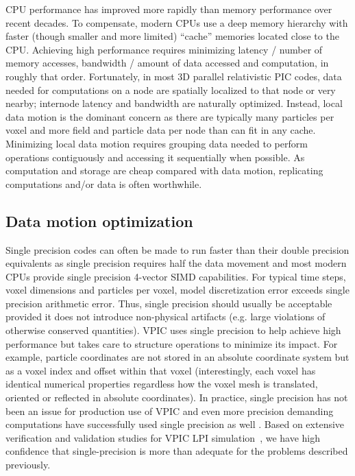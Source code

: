 \documentclass[letter,10pt]{article}
\begin{document}
CPU performance has improved more rapidly than memory performance over
recent decades.  To compensate, modern CPUs use a deep memory
hierarchy with faster (though smaller and more limited) ``cache''
memories located close to the CPU.  Achieving high performance
requires minimizing latency / number of memory accesses, bandwidth /
amount of data accessed and computation, in roughly that order.
Fortunately, in most 3D parallel relativistic PIC codes, data needed
for computations on a node are spatially localized to that node or
very nearby; internode latency and bandwidth are naturally optimized.
Instead, local data motion is the dominant concern as there are
typically many particles per voxel and more field and particle data
per node than can fit in any cache.  Minimizing local data motion
requires grouping data needed to perform operations contiguously and
accessing it sequentially when possible.  As computation and storage
are cheap compared with data motion, replicating computations and/or
data is often worthwhile.

\subsection{Data motion optimization}

Single precision codes can often be made to run faster than their
double precision equivalents as single precision requires half the
data movement and most modern CPUs provide single precision 4-vector
SIMD capabilities.  For typical time steps, voxel dimensions and
particles per voxel, model discretization error exceeds single
precision arithmetic error.  Thus, single precision should usually be
acceptable provided it does not introduce non-physical artifacts
(e.g. large violations of otherwise conserved quantities).  VPIC uses
single precision to help achieve high performance but takes care to
structure operations to minimize its impact.  For example, particle
coordinates are not stored in an absolute coordinate system but as a
voxel index and offset within that voxel (interestingly, each voxel
has identical numerical properties regardless how the voxel mesh is
translated, oriented or reflected in absolute coordinates).  In
practice, single precision has not been an issue for production use of
VPIC and even more precision demanding computations have successfully
used single precision as well
\cite{Bowers_et_al_2006,Langou_et_al_2006,Lippert_et_al_2007}.
Based on extensive verification and validation studies for VPIC LPI
simulation~\cite{Yin_et_al_Phys_Plasmas_2006}, we have high confidence
that single-precision is more than adequate for the problems
described previously.
\end{document}
